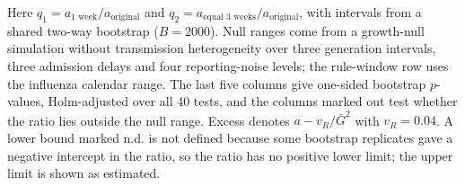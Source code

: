 \begin{table}[htbp]
\begin{tabular}{lrllllrrrrr}
\bottomrule
\end{tabular}
\par\smallskip
\begin{minipage}{0.95\linewidth}\scriptsize Here $q_1=a_{\text{1 week}}/a_{\text{original}}$ and $q_2=a_{\text{equal 3 weeks}}/a_{\text{original}}$, with intervals from a shared two-way bootstrap ($B=2000$). Null ranges come from a growth-null simulation without transmission heterogeneity over three generation intervals, three admission delays and four reporting-noise levels; the rule-window row uses the influenza calendar range. The last five columns give one-sided bootstrap $p$-values, Holm-adjusted over all 40 tests, and the columns marked out test whether the ratio lies outside the null range. Excess denotes $a-v_R/\bar{G}^2$ with $v_R=0.04$. A lower bound marked n.d. is not defined because some bootstrap replicates gave a negative intercept in the ratio, so the ratio has no positive lower limit; the upper limit is shown as estimated.\end{minipage}
\end{table}
